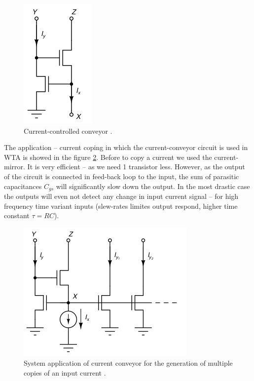 \documentclass[report]{subfiles}
\begin{document}
\begin{figure}[htbp]
  \centering
  \includegraphics[scale=0.8]{pics/current_conveyor.jpg}
  \caption{Current-controlled conveyor \cite{book:VLSI}.}
  \label{fig:current_conveyor}
\end{figure} 

The application -- current coping in which the current-conveyor circuit is used in WTA is showed in the figure \ref{fig:current_conveyor_application}. Before to copy a current we used the current-mirror. It is very efficient -- as we need 1 transistor less. However, as the output of the circuit is connected in feed-back loop to the input, the sum of parasitic capacitances $C_{gs}$ will significantly slow down the output. In the most drastic case the outputs will even not detect any change in input current signal -- for high frequency time variant inputs (slew-rates limites output respond, higher time constant $\tau = RC$).

\begin{figure}[htbp]
  \centering
  \includegraphics[scale=0.8]{pics/current_conveyor_application.jpg}
  \caption{System application of current conveyor for the generation of multiple copies of an input current \cite{book:VLSI}.}
  \label{fig:current_conveyor_application}
\end{figure} 
\end{document}
